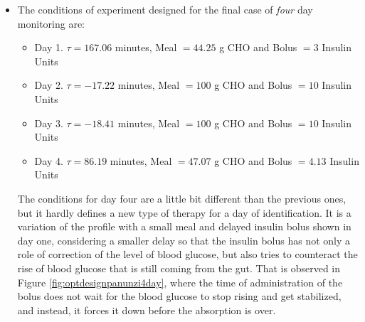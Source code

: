 \begin{itemize}
{In this case the advanced bolus administration is given in two out of the three days of the experiment, while the other day a small meal is given, with the insulin bolus delayed 165 minutes, just like in the two days experiment. The fact that the ``bolus given in advance'' scenario is repeated proves that there is more information to be extracted from the excitation of the insulin absorption model than in the rest of the system. This conclusion is repeated for both model's experiment design. The simulated glucose profile of the model is shown in Figure \ref{fig:optdesignpanunzi3day}.

\begin{figure}[hbt]
\centering
{}\caption{Modified Panunzi's model response to the proposed experiment for a 3 days monitoring. Meals are ingested at time 120, 1020 and 1920 min.}
\label{fig:optdesignpanunzi3day}
\end{figure}


This is a very good example of how the different experiments designed for each independent day are not dependent on the order of those days. Sometimes the case of the small meal and delayed bolus happens in the first day, some others at the end, and it can also be in the middle of the 3 days. Also, it is confirmed that increasing the number of experiments causes the richest information postprandial period to repeat in order to maximize the identifiability. No further synergies between different days where observed, and every day is independent in the optimization algorithm.}

\item{The conditions of experiment designed for the final case of \textit{four} day monitoring are:
\begin{itemize}
	\item Day 1. $\tau = 167.06$ minutes, Meal $= 44.25$ g CHO and Bolus $=3$ Insulin Units
	\item Day 2. $\tau = -17.22$ minutes, Meal $= 100$ g CHO and Bolus $=10$ Insulin Units
	\item Day 3. $\tau = -18.41$ minutes, Meal $= 100$ g CHO and Bolus $=10$ Insulin Units
  \item Day 4. $\tau = 86.19$ minutes, Meal $= 47.07$ g CHO and Bolus $=4.13$ Insulin Units
\end{itemize}

The conditions for day four are a little bit different than the previous ones, but it hardly defines a new type of therapy for a day of identification. It is a variation of the profile with a small meal and delayed insulin bolus shown in day one, considering a smaller delay so that the insulin bolus has not only a role of correction of the level of blood glucose, but also tries to counteract the rise of blood glucose that is still coming from the gut. That is observed in Figure \ref{fig:optdesignpanunzi4day}, where the time of administration of the bolus does not wait for the blood glucose to stop rising and get stabilized, and instead, it forces it down before the absorption is over.}
\end{itemize}

